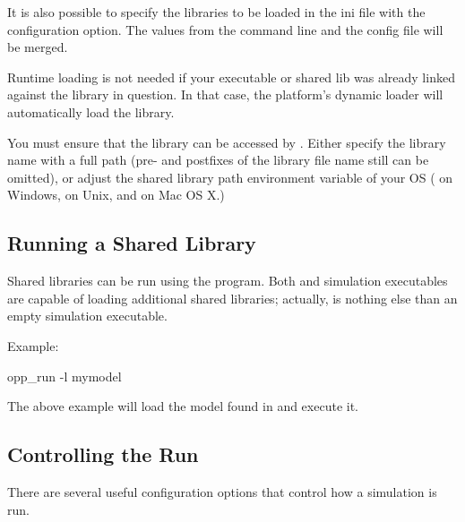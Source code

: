 It is also possible to specify the libraries to be loaded in the ini file
with the  configuration option. The values from the command line
and the config file will be merged.

\begin{note}
  Runtime loading is not needed if your executable or shared lib was
  already linked against the library in question. In that case,
  the platform's dynamic loader will automatically load the library.
\end{note}

\begin{note}
  You must ensure that the library can be accessed by {\opp}. Either specify the
  library name with a full path (pre- and postfixes of the library file name
  still can be omitted), or adjust the shared library path environment variable
  of your OS ( on Windows,  on Unix, and
   on Mac OS X.)
\end{note}

\subsection{Running a Shared Library}

Shared libraries can be run using the  program.
Both  and simulation executables are capable of
loading additional shared libraries; actually, 
is nothing else than an empty simulation executable.

Example:
\begin{commandline}
opp_run -l mymodel
\end{commandline}

The above example will load the model found in  and execute it.

\subsection{Controlling the Run}

There are several useful configuration options that control how a simulation is run.

